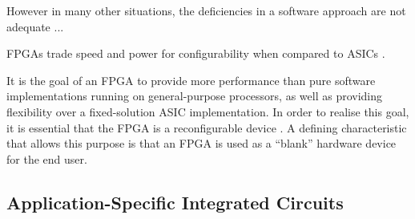 However in many other situations, the deficiencies in a software approach are
not adequate ...

\glspl{FPGA} trade speed and power for configurability when compared to
\glspl{ASIC} \cite{Hauck:2007}.

It is the goal of an \gls{FPGA} to provide more performance than pure software
implementations running on general-purpose processors, as well as providing
flexibility over a fixed-solution \gls{ASIC} implementation. In order to realise
this goal, it is essential that the \gls{FPGA} is a reconfigurable device
\cite{Hauck:2007}. A defining characteristic that allows this purpose is that
an \gls{FPGA} is used as a ``blank'' hardware device for the end user.

\subsection{Application-Specific Integrated Circuits}
\label{asic}
